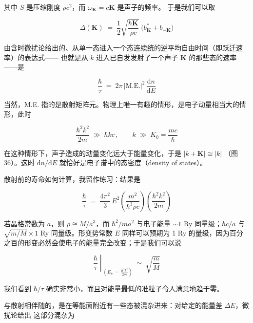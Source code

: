 其中 $S$ 是压缩刚度 $\rho c^{2}$，而 $\omega_{\mathbf{K}} = c\mathbf{K}$ 是声子的频率。
于是我们可以取

\begin{equation*}
\Delta(\mathbf{K}) \;=\; \frac{1}{2}\sqrt{\frac{\hbar\mathbf{K}}{\rho c}}\;\bigl(b_{\mathbf{K}}^{*} + b_{-\mathbf{K}}\bigr)
\end{equation*}

由含时微扰论给出的、从单一态进入一个态连续统的逆平均自由时间（即跃迁速率）的表达式——
也就是从 $k$ 进入已自发发射了一个声子 $\mathbf{K}$ 的那些态的速率——是

\begin{equation*}
\frac{\hbar}{\tau} \;=\; 2\pi\,\bigl|\text{M.E.}\bigr|^{2}\,\frac{\mathrm{d}n}{\mathrm{d}E}
\end{equation*}

当然，M.E. 指的是散射矩阵元。物理上唯一有趣的情形，是电子动量相当大的情形，此时

\begin{equation*}
\frac{\hbar^{2}k^{2}}{2m} \;\gg\; \hbar k c\,,\qquad k \;\gg\; K_{0} = \frac{mc}{\hbar}
\end{equation*}

在这种情形下，声子造成的动量变化远大于能量变化，于是 $|k+\mathbf{K}| \cong |k|$
（图 36）。这时 $\mathrm{d}n/\mathrm{d}E$ 就恰好是电子谱中的态密度（density of states）。


散射前的寿命如何计算，我留作练习：结果是

\begin{equation*}
\frac{\hbar}{\tau} \;=\; \frac{4\pi^{2}}{3}\, E^{2} \left(\frac{m^{2}}{\hbar^{3}\rho c}\right) \left(\frac{\hbar^{2}k^{2}}{2m}\right)
\tag{10}
\end{equation*}

若晶格常数为 $a$，则 $\rho \cong M/a^{3}$，而 $\hbar^{2}/ma^{2}$ 与电子能量 $\sim 1$ Ry
同量级；$\hbar c/a$ 与 $\sqrt{m/M} \times 1$ Ry 同量级。形变势常数 $E$ 同样可以预期为
1 Ry 的量级，因为百分之百的形变必然会使电子的能量完全改变；于是我们可以说

\begin{equation*}
\left.\frac{\hbar}{\tau}\;\right|_{\;\left(E_{k} \,=\, \frac{\hbar^{2}k^{2}}{2m}\right)} \;\sim\; \sqrt{\frac{m}{M}}
\end{equation*}

我们看到 $\hbar/\tau$ 确实非常小，而且对能量最低的准粒子令人满意地趋于零。

与散射相伴随的，是在等能面附近有一些态被混杂进来：对给定的能量差 $\Delta E$，微扰论给出
这部分混杂为

